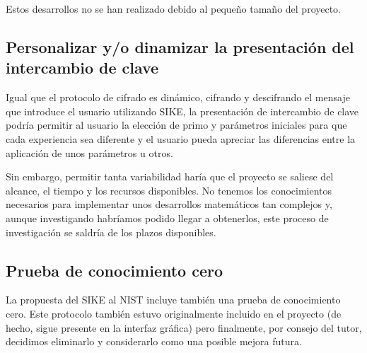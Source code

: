 Estos desarrollos no se han realizado debido al pequeño tamaño del proyecto.


\subsection{Personalizar y/o dinamizar la presentación del intercambio de clave}

Igual que el protocolo de cifrado es dinámico, cifrando y descifrando el mensaje que introduce el usuario utilizando SIKE, la presentación de intercambio de clave podría permitir al usuario la elección de primo y parámetros iniciales para que cada experiencia sea diferente y el usuario pueda apreciar las diferencias entre la aplicación de unos parámetros u otros.

Sin embargo, permitir tanta variabilidad haría que el proyecto se saliese del alcance, el tiempo y los recursos disponibles. No tenemos los conocimientos necesarios para implementar unos desarrollos matemáticos tan complejos y, aunque investigando habríamos podido llegar a obtenerlos, este proceso de investigación se saldría de los plazos disponibles. 


\subsection{Prueba de conocimiento cero}

La propuesta del SIKE al NIST incluye también una prueba de conocimiento cero. Este protocolo también estuvo originalmente incluido en el proyecto (de hecho, sigue presente en la interfaz gráfica) pero finalmente, por consejo del tutor, decidimos eliminarlo y considerarlo como una posible mejora futura.
